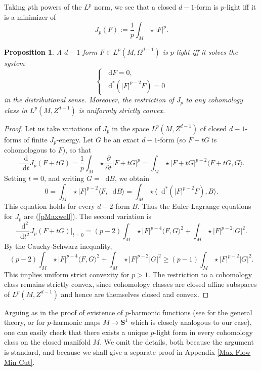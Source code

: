 \documentclass[reqno,11pt]{amsart}
\newcommand{\Sph}{\mathbf S}
\newcommand*\dif{\mathop{}\!\mathrm{d}}
\newtheorem{proposition}[theorem]{Proposition}
\theoremstyle{definition}
\numberwithin{equation}{section}
\begin{document}
Taking $p$th powers of the $L^p$ norm, we see that a closed $d - 1$-form is $p$-light iff it is a minimizer of
$$J_p(F) := \frac{1}{p} \int_M \star |F|^p.$$

\begin{proposition}
A $d - 1$-form $F \in L^p(M, \Omega^{d - 1})$ is $p$-light iff it solves the system
\begin{equation}\label{pMaxwell}
\begin{cases}
	\dif F = 0, \\
	\dif^*(|F|^{p - 2} F) = 0
\end{cases}
\end{equation}
in the distributional sense. Moreover, the restriction of $J_p$ to any cohomology class in $L^p(M, Z^{d - 1})$ is uniformly strictly convex.
\end{proposition}
\begin{proof}
Let us take variations of $J_p$ in the space $L^p(M, Z^{d - 1})$ of closed $d-1$-forms of finite $J_p$-energy.
Let $G$ be an exact $d - 1$-form (so $F + tG$ is cohomologous to $F$), so that
$$\frac{\dif}{\dif t} J_p(F + tG) = \frac{1}{p} \int_M \star \frac{\partial}{\partial t} |F + tG|^p = \int_M \star |F + tG|^{p - 2} \langle F + tG, G\rangle.$$
Setting $t = 0$, and writing $G = \dif B$, we obtain 
$$0 = \int_M \star |F|^{p - 2} \langle F, \dif B\rangle = \int_M \star \langle \dif^*(|F|^{p - 2} F), B\rangle.$$
This equation holds for every $d - 2$-form $B$.
Thus the Euler-Lagrange equations for $J_p$ are (\ref{pMaxwell}).
The second variation is 
$$\frac{\dif^2}{\dif t^2} J_p(F + tG)\bigg|_{t = 0} = (p - 2) \int_M \star |F|^{p - 4} \langle F, G\rangle^2 + \int_M \star |F|^{p - 2} |G|^2.$$
By the Cauchy-Schwarz inequality,
$$(p - 2) \int_M \star |F|^{p - 4} \langle F, G\rangle^2 + \int_M \star |F|^{p - 2} |G|^2 \geq (p - 1) \int_M \star |F|^{p - 2} |G|^2.$$
This implies uniform strict convexity for $p > 1$.
The restriction to a cohomology class remains strictly convex, since cohomology classes are closed affine subspaces of $L^p(M, Z^{d - 1})$ and hence are themselves closed and convex.
\end{proof}

Arguing as in the proof of existence of $p$-harmonic functions (see \cite[\S8.2]{evans2010partial} for the general theory, or \cite[\S2.1]{daskalopoulos2020transverse} for $p$-harmonic maps $M \to \Sph^1$ which is closely analogous to our case), one can easily check that there exists a unique $p$-light form in every cohomology class on the closed manifold $M$.
We omit the details, both because the argument is standard, and because we shall give a separate proof in Appendix \ref{Max Flow Min Cut}.
\end{document}
